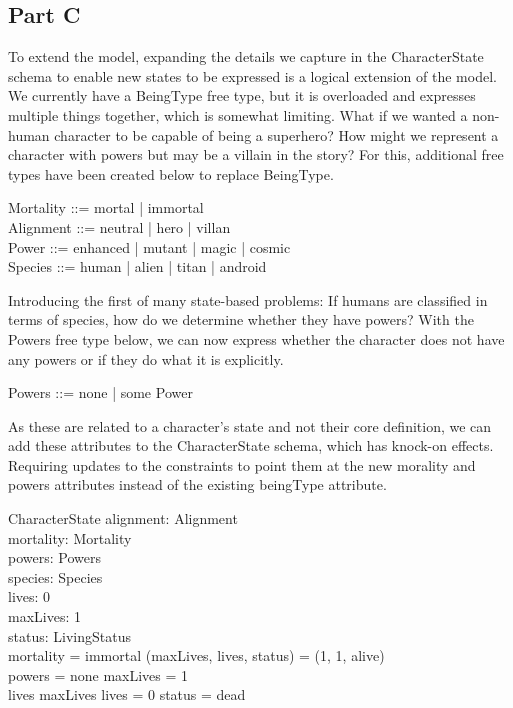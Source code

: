 \documentclass{article}
\begin{document}
\subsection*{Part C}

To extend the model, expanding the details we capture in the CharacterState schema to enable new states to be expressed is a logical extension of the model. We currently have a BeingType free type, but it is overloaded and expresses multiple things together, which is somewhat limiting. What if we wanted a non-human character to be capable of being a superhero? How might we represent a character with powers but may be a villain in the story? For this, additional free types have been created below to replace BeingType. 

\begin{zed}
Mortality ::= mortal | immortal \\
Alignment ::= neutral | hero | villan \\
Power ::= enhanced | mutant | magic | cosmic \\
Species ::= human | alien | titan | android \\
\end{zed}

\hspace{-0.68cm} Introducing the first of many state-based problems: If humans are classified in terms of species, how do we determine whether they have powers? With the Powers free type below, we can now express whether the character does not have any powers or if they do what it is explicitly.

\begin{zed}
Powers ::= none | some \ldata Power \rdata \\
\end{zed}

\hspace{-0.68cm} As these are related to a character's state and not their core definition, we can add these attributes to the CharacterState schema, which has knock-on effects. Requiring updates to the constraints to point them at the new morality and powers attributes instead of the existing beingType attribute.

\begin{schema}{CharacterState}
alignment: Alignment \\
mortality: Mortality \\
powers: Powers \\
species: Species \\
lives: 0   \\ 
maxLives: 1  \\ 
status: LivingStatus \\
\where
mortality = immortal \implies (maxLives, lives, status) = (1, 1, alive) \\
powers = none \implies maxLives = 1 \\ 
lives \leq maxLives \land lives = 0 \implies status = dead \\
\end{schema}
\end{document}
